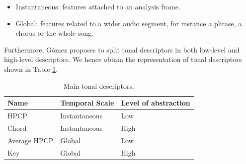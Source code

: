 \begin{itemize}
\item Instantaneous: features attached to an analysis frame.
\item Global: features related to a wider audio segment, for instance a phrase, a chorus or the whole song.
\end{itemize}
Furthermore, Gómez proposes to split tonal descriptors in both low-level and high-level descriptors. We hence obtain the representation of tonal descriptors shown in Table \ref{table:tonaldescriptors}.
\begin{table}[h]
\begin{center}
\begin{tabular} { l l l }
\hline
Name         & Temporal Scale & Level of abstraction \\ \hline
HPCP         & Instantaneous  & Low                  \\ 
Chord        & Instantaneous  & High                 \\ 
Average HPCP & Global         & Low                  \\ 
Key          & Global         & High                 \\ \hline
\end{tabular}
\caption[Main tonal descriptors]{Main tonal descriptors.}
\label{table:tonaldescriptors}
\end{center}
\end{table}


